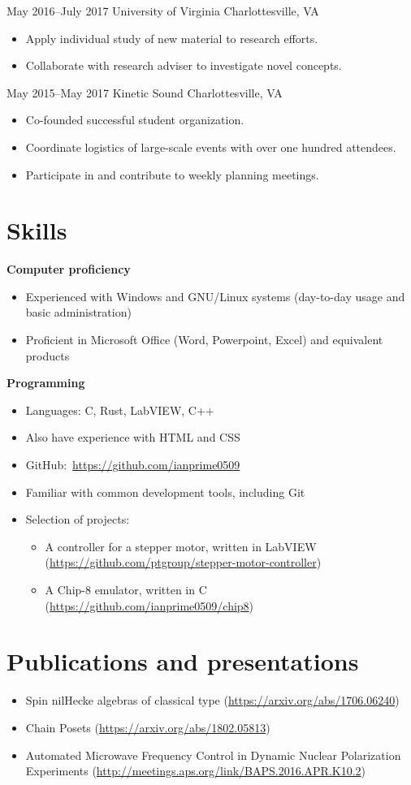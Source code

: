 \documentclass[10pt]{article}
\begin{document}
{May 2016--July 2017}
{University of Virginia}
{Charlottesville, VA}
\begin{itemize}
\item Apply individual study of new material to research efforts.
\item Collaborate with research adviser to investigate novel concepts.
\end{itemize}

{May 2015--May 2017}
{Kinetic Sound}
{Charlottesville, VA}
\begin{itemize}
\item Co-founded successful student organization.
\item Coordinate logistics of large-scale events with over one hundred attendees.
\item Participate in and contribute to weekly planning meetings.
\end{itemize}

\section*{Skills}
\textbf{Computer proficiency}
\begin{itemize}
\item Experienced with Windows and GNU/Linux systems (day-to-day usage and
  basic administration)
\item Proficient in Microsoft Office (Word, Powerpoint, Excel) and equivalent
  products
\end{itemize}
\textbf{Programming}
\begin{itemize}
\item Languages: C, Rust, LabVIEW, C++
\item Also have experience with HTML and CSS
\item GitHub:~\url{https://github.com/ianprime0509}
\item Familiar with common development tools, including Git
\item Selection of projects:
  \begin{itemize}
  \item A controller for a stepper motor, written in LabVIEW
    (\url{https://github.com/ptgroup/stepper-motor-controller})
  \item A Chip-8 emulator, written in C
    (\url{https://github.com/ianprime0509/chip8})
  \end{itemize}
\end{itemize}

\section*{Publications and presentations}
\begin{itemize}
\item Spin nilHecke algebras of classical type
  (\url{https://arxiv.org/abs/1706.06240})
\item Chain Posets (\url{https://arxiv.org/abs/1802.05813})
\item Automated Microwave Frequency Control in Dynamic Nuclear Polarization
  Experiments (\url{http://meetings.aps.org/link/BAPS.2016.APR.K10.2})
\end{itemize}
\end{document}
